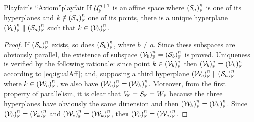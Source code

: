 \begin{mteo}{Playfair's ``Axiom''}{playfair}
If $\eamd{U}{F}{n+1}$ is an affine space where $\eamsd{S}{F}{a}{n}$ is one of its hyperplanes and $k\notin \eamsd{S}{F}{a}{n}$ one of its points, there is a unique hyperplane $\eamsd{V}{F}{b}{n}\parallel\eamsd{S}{F}{a}{n}$ such that $k\in\eamsd{V}{F}{b}{n}$.
\end{mteo}

{\footnotesize
\begin{proof}
If $\eamsd{S}{F}{a}{n}$ exists, so does $\eamsd{S}{F}{b}{n}$, where $b\neq a$. Since these subspaces are obviously parallel, the existence of subspace $\eamsd{V}{F}{b}{n}=\eamsd{S}{F}{b}{n}$ is proved. Uniqueness is verified by the following rationale: since point $k\in\eamsd{V}{F}{b}{n}$ then $\eamsd{V}{F}{b}{n}=\eamsd{V}{F}{k}{n}$ according to \eqref{eq:igualAff}; and, supposing a third hyperplane $\eamsd{W}{F}{c}{n}\parallel \eamsd{S}{F}{a}{n}$ where $k\in\eamsd{W}{F}{c}{n}$, we also have $\eamsd{W}{F}{c}{n}=\eamsd{W}{F}{k}{n}$. Moreover, from the first property of parallelism, it is clear that $V_\cam{F}=S_\cam{F}=W_\cam{F}$ because the three hyperplanes have obviously the same dimension and then $\eamsd{W}{F}{k}{n}=\eamsd{V}{F}{k}{n}$. Since $\eamsd{V}{F}{b}{n}=\eamsd{V}{F}{k}{n}$ and $\eamsd{W}{F}{c}{n}=\eamsd{W}{F}{k}{n}$, then $\eamsd{V}{F}{b}{n}=\eamsd{W}{F}{c}{n}$. 
\end{proof}}

